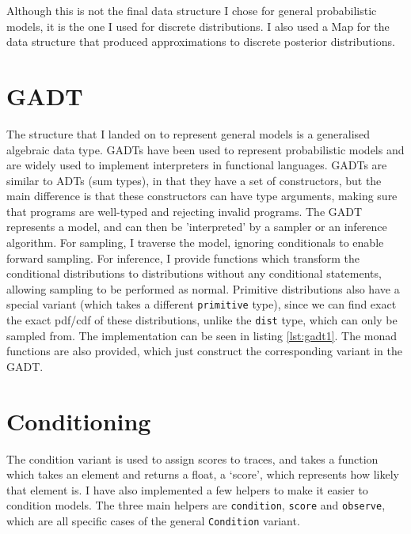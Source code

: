 

Although this is not the final data structure I chose for general probabilistic models, it is the one I used for discrete distributions. I also used a Map for the data structure that produced approximations to discrete posterior distributions.

\section{GADT}

The structure that I landed on to represent general models is a generalised algebraic data type. GADTs have been used to represent probabilistic models \cite{scibior2015practical} and are widely used to implement interpreters in functional languages. GADTs are similar to ADTs (sum types), in that they have a set of constructors, but the main difference is that these constructors can have type arguments, making sure that programs are well-typed and rejecting invalid programs. The GADT represents a model, and can then be 'interpreted' by a sampler or an inference algorithm. For sampling, I traverse the model, ignoring conditionals to enable forward sampling. For inference, I provide functions which transform the conditional distributions to distributions without any conditional statements, allowing sampling to be performed as normal. Primitive distributions also have a special variant (which takes a different \texttt{primitive} type), since we can find exact the exact pdf/cdf of these distributions, unlike the \texttt{dist} type, which can only be sampled from. The implementation can be seen in listing \ref{lst:gadt1}. The monad functions are also provided, which just construct the corresponding variant in the GADT.



\section{Conditioning}
The condition variant is used to assign scores to traces, and takes a function which takes an element and returns a float, a `score', which represents how likely that element is. I have also implemented a few helpers to make it easier to condition models. The three main helpers are \texttt{condition}, \texttt{score} and \texttt{observe}, which are all specific cases of the general \texttt{Condition} variant. 

